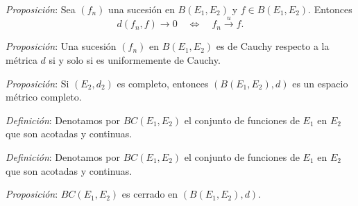 \documentclass{beamer}
\begin{document}
  \begin{frame}
    \textit{Proposición}: Sea $(f_n)$ una sucesión en $B(E_1,E_2)$ y $f\in B(E_1,E_2)$. Entonces
    \[d(f_n,f)\longrightarrow 0\quad\Longleftrightarrow\quad f_n\xrightarrow{u}f.\]
  \end{frame}

  \begin{frame}
    \textit{Proposición}: Una sucesión $(f_n)$ en $B(E_1,E_2)$ es de Cauchy respecto a la métrica $d$ si y solo si es uniformemente de Cauchy.
  \end{frame}

  \begin{frame}
    \textit{Proposición}: Si $(E_2,d_2)$ es completo, entonces $(B(E_1,E_2),d)$ es un espacio métrico completo.
  \end{frame}

  \begin{frame}
    \textit{Definición}: Denotamos por $BC(E_1,E_2)$ el conjunto de funciones de $E_1$ en $E_2$ que son acotadas y continuas.
  \end{frame}

  \begin{frame}
    \textit{Definición}: Denotamos por $BC(E_1,E_2)$ el conjunto de funciones de $E_1$ en $E_2$ que son acotadas y continuas.

    \textit{Proposición}: $BC(E_1,E_2)$ es cerrado en $(B(E_1,E_2),d)$.
  \end{frame}
\end{document}
